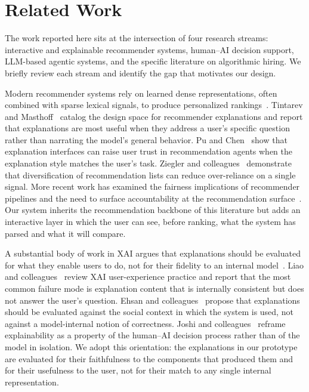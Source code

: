 \section{Related Work}\label{sec:2}

The work reported here sits at the intersection of four research streams: interactive and explainable recommender systems, human--{AI} decision support, LLM-based agentic systems, and the specific literature on algorithmic hiring.
We briefly review each stream and identify the gap that motivates our design.

Modern recommender systems rely on learned dense representations, often combined with sparse lexical signals, to produce personalized rankings~\cite{he2017neural,covington2016deep}.
Tintarev and Masthoff~\citeyear{tintarev2015explaining} catalog the design space for recommender explanations and report that explanations are most useful when they address a user's specific question rather than narrating the model's general behavior.
Pu and Chen~\citeyear{pu2007evaluating} show that explanation interfaces can raise user trust in recommendation agents when the explanation style matches the user's task.
Ziegler and colleagues~\citeyear{ziegler2005improving} demonstrate that diversification of recommendation lists can reduce over-reliance on a single signal.
More recent work has examined the fairness implications of recommender pipelines and the need to surface accountability at the recommendation surface~\cite{ekstrand2021rethinking,chen2023causal}.
Our system inherits the recommendation backbone of this literature but adds an interactive layer in which the user can see, before ranking, what the system has parsed and what it will compare.

A substantial body of work in {XAI} argues that explanations should be evaluated for what they enable users to do, not for their fidelity to an internal model~\cite{miller2019explanation,gunning2017explainable}.
Liao and colleagues~\citeyear{liao2020questioning} review {XAI} user-experience practice and report that the most common failure mode is explanation content that is internally consistent but does not answer the user's question.
Ehsan and colleagues~\citeyear{ehsan2021algorithmic,ehsan2022operationalizing} propose that explanations should be evaluated against the social context in which the system is used, not against a model-internal notion of correctness.
Joshi and colleagues~\citeyear{joshi2021real} reframe explainability as a property of the human--{AI} decision process rather than of the model in isolation.
We adopt this orientation: the explanations in our prototype are evaluated for their faithfulness to the components that produced them and for their usefulness to the user, not for their match to any single internal representation.

